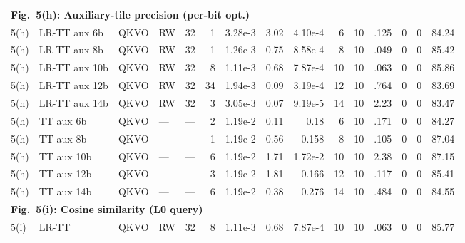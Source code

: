 \documentclass[fleqn,10pt]{wlscirep}
\begin{document}
{\begin{longtable}{@{}l l l l r r r r r r r r r r r@{}}
\multicolumn{15}{l}{\cellcolor{HeadGray}\textbf{Fig.~5(h): Auxiliary-tile precision (per-bit opt.)}} \\
5(h) & LR-TT aux 6b & QKVO & RW & 32 & 1 & 3.28e-3 & 3.02 & 4.10e-4 & 6 & 10 & .125 & 0 & 0 & 84.24 \\
5(h) & LR-TT aux 8b & QKVO & RW & 32 & 1 & 1.26e-3 & 0.75 & 8.58e-4 & 8 & 10 & .049 & 0 & 0 & 85.42 \\
5(h) & LR-TT aux 10b & QKVO & RW & 32 & 8 & 1.11e-3 & 0.68 & 7.87e-4 & 10 & 10 & .063 & 0 & 0 & 85.86 \\
5(h) & LR-TT aux 12b & QKVO & RW & 32 & 34 & 1.94e-3 & 0.09 & 3.19e-4 & 12 & 10 & .764 & 0 & 0 & 83.69 \\
5(h) & LR-TT aux 14b & QKVO & RW & 32 & 3 & 3.05e-3 & 0.07 & 9.19e-5 & 14 & 10 & 2.23 & 0 & 0 & 83.47 \\
5(h) & TT aux 6b & QKVO & --- & --- & 2 & 1.19e-2 & 0.11 & 0.18 & 6 & 10 & .171 & 0 & 0 & 84.27 \\
5(h) & TT aux 8b & QKVO & --- & --- & 1 & 1.19e-2 & 0.56 & 0.158 & 8 & 10 & .105 & 0 & 0 & 87.04 \\
5(h) & TT aux 10b & QKVO & --- & --- & 6 & 1.19e-2 & 1.71 & 1.72e-2 & 10 & 10 & 2.38 & 0 & 0 & 87.15 \\
5(h) & TT aux 12b & QKVO & --- & --- & 3 & 1.19e-2 & 1.81 & 0.166 & 12 & 10 & .117 & 0 & 0 & 85.41 \\
5(h) & TT aux 14b & QKVO & --- & --- & 6 & 1.19e-2 & 0.38 & 0.276 & 14 & 10 & .484 & 0 & 0 & 84.55 \\
\midrule

\multicolumn{15}{l}{\cellcolor{HeadGray}\textbf{Fig.~5(i): Cosine similarity (L0 query)}} \\
5(i) & LR-TT & QKVO & RW & 32 & 8 & 1.11e-3 & 0.68 & 7.87e-4 & 10 & 10 & .063 & 0 & 0 & 85.77 \\
\midrule


\end{longtable}}
\end{document}
